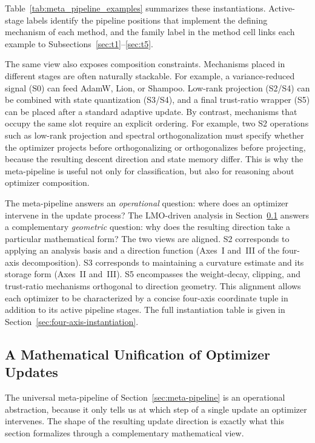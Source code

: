 Table~\ref{tab:meta_pipeline_examples} summarizes these instantiations.
Active-stage labels identify the pipeline positions that implement the
defining mechanism of each method, and the family label in the method cell
links each example to Subsections~\ref{sec:t1}--\ref{sec:t5}.




The same view also exposes composition constraints.  Mechanisms placed in
different stages are often naturally stackable.  For example, a variance-reduced signal
(S0) can feed AdamW, Lion, or Shampoo.  Low-rank projection (S2/S4) can be
combined with state quantization (S3/S4), and a final trust-ratio wrapper (S5)
can be placed after a standard adaptive update.  By contrast, mechanisms that
occupy the same slot require an explicit ordering.  For example, two S2
operations such as low-rank projection and spectral orthogonalization must
specify whether the optimizer projects before orthogonalizing or
orthogonalizes before projecting, because the resulting descent direction and
state memory differ.  This is why the meta-pipeline is useful not only for
classification, but also for reasoning about optimizer composition.

The meta-pipeline answers an \emph{operational} question: where does an
optimizer intervene in the update process?  The LMO-driven analysis in
Section~\ref{sec:lmo-four-axis} answers a complementary \emph{geometric}
question: why does the resulting direction take a particular mathematical
form?  The two views are aligned.  S2 corresponds to applying an analysis
basis and a direction function (Axes~I and~III of the four-axis decomposition).
S3 corresponds to maintaining a curvature estimate and its storage form
(Axes~II and~III).  S5 encompasses the weight-decay, clipping, and
trust-ratio mechanisms orthogonal to direction geometry.  This alignment
allows each optimizer to be characterized by a concise four-axis coordinate
tuple in addition to its active pipeline stages.  The full instantiation table
is given in Section~\ref{sec:four-axis-instantiation}.

\subsection{A Mathematical Unification of Optimizer Updates}
\label{sec:lmo-four-axis}

The universal meta-pipeline of Section~\ref{sec:meta-pipeline} is an operational abstraction, because it only tells us at which step of a single update an optimizer intervenes. The shape of the resulting update direction is exactly what this section formalizes through a complementary mathematical view.

